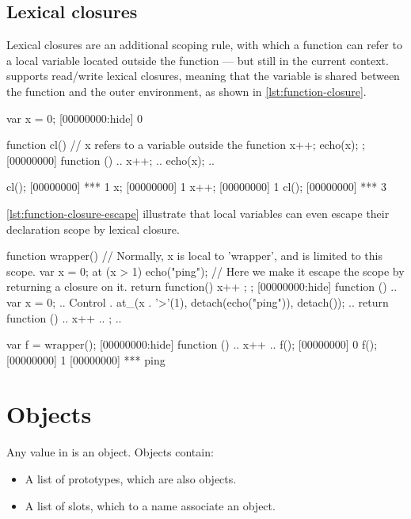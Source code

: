 \subsection{Lexical closures}
\label{sec:us-fun-closures}

Lexical closures are an additional scoping rule, with which a function
can refer to a local variable located outside the function --- but still
in the current context. \us supports read/write lexical closures,
meaning that the variable is shared between the function and the outer
environment, as shown in \autoref{lst:function-closure}.

\begin{urbiscript}[caption=Lexical
  closure,label=lst:function-closure,float=\floatpos]
var x = 0;
[00000000:hide] 0

function cl()
{
  // x refers to a variable outside the function
  x++;
  echo(x);
};
[00000000] function () {
..  x++;
..  echo(x);
..}

cl();
[00000000] *** 1
x;
[00000000] 1
x++;
[00000000] 1
cl();
[00000000] *** 3
\end{urbiscript}

\autoref{lst:function-closure-escape} illustrate that local variables can even
escape their declaration scope by lexical closure.

\begin{urbiscript}[caption=Local variable escaping its scope by
  lexical closure.,label=lst:function-closure-escape,float=\floatpos]
function wrapper()
{
  // Normally, x is local to 'wrapper', and is limited to this scope.
  var x = 0;
  at (x > 1)
    echo("ping");
  // Here we make it escape the scope by returning a closure on it.
  return function() { x++ };
};
[00000000:hide] function () {
..  var x = 0;
..  Control . at_(x . '>'(1), detach(echo("ping")), detach({}));
..  return function () {
..    x++
..  };
..}

var f = wrapper();
[00000000:hide] function () {
..  x++
..}
f();
[00000000] 0
f();
[00000000] 1
[00000000] *** ping
\end{urbiscript}

\FloatBarrier
\section{Objects}

Any value in \us is an object. Objects contain:

\begin{itemize}
\item A list of prototypes, which are also objects.
\item A list of slots, which to a name associate an object.
\end{itemize}

